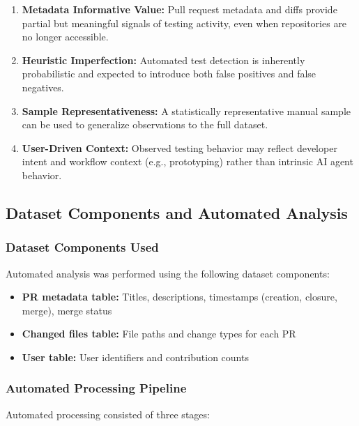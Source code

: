 \documentclass[conference]{IEEEtran}
\begin{document}
\begin{enumerate}
    \item \textbf{Metadata Informative Value:} Pull request metadata and diffs provide partial but meaningful signals of testing activity, even when repositories are no longer accessible.
    
    \item \textbf{Heuristic Imperfection:} Automated test detection is inherently probabilistic and expected to introduce both false positives and false negatives.
    
    \item \textbf{Sample Representativeness:} A statistically representative manual sample can be used to generalize observations to the full dataset.
    
    \item \textbf{User-Driven Context:} Observed testing behavior may reflect developer intent and workflow context (e.g., prototyping) rather than intrinsic AI agent behavior.
\end{enumerate}

\subsection{Dataset Components and Automated Analysis}

\subsubsection{Dataset Components Used}

Automated analysis was performed using the following dataset components:

\begin{itemize}
    \item \textbf{PR metadata table:} Titles, descriptions, timestamps (creation, closure, merge), merge status
    \item \textbf{Changed files table:} File paths and change types for each PR
    \item \textbf{User table:} User identifiers and contribution counts
\end{itemize}

\subsubsection{Automated Processing Pipeline}

Automated processing consisted of three stages:
\end{document}
